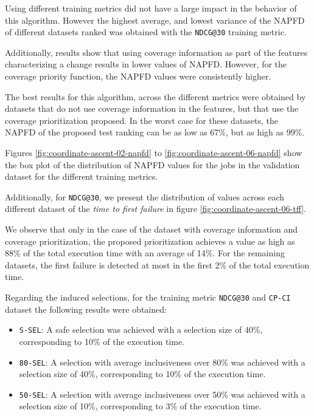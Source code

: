 Using different training metrics did not have a large impact in the behavior of this algorithm. 
However the highest average, and lowest variance of the NAPFD of different datasets ranked was obtained with the 
\texttt{NDCG@30} training metric.

Additionally, results show that using coverage information as part of the features characterizing a change
results in lower values of NAPFD. However, for the coverage priority function, the NAPFD values were 
consistently higher.

The best results for this algorithm, across the different metrics were obtained by datasets that do not
use coverage information in the features, but that use the coverage prioritization proposed. In the worst case
for these datasets, the NAPFD of the proposed test ranking can be as low as 67\%, but as high as 99\%.

Figures \ref{fig:coordinate-ascent-02-napfd} to \ref{fig:coordinate-ascent-06-napfd} show the box plot of the distribution
of NAPFD values for the jobs in the validation dataset for the different training metrics. 

Additionally, for \texttt{NDCG@30}, we present the distribution of values 
across each different dataset of the \emph{time to first failure} in figure \ref{fig:coordinate-ascent-06-tff}. 

We observe that only in the case of the dataset with coverage information and coverage prioritization, the proposed prioritization
achieves a value as high as 88\% of the total execution time with an average of 14\%. For the remaining datasets, the first failure is detected
at most in the first 2\% of the total execution time.

Regarding the induced selections, for the training metric \texttt{NDCG@30} and \texttt{CP-CI} dataset the following results were obtained:
\begin{itemize}
    \item \texttt{S-SEL}: A safe selection was achieved with a selection size of 40\%, corresponding to 10\% of the execution time.
    \item \texttt{80-SEL}: A selection with average inclusiveness over 80\% was achieved with a selection size of 40\%, corresponding to 10\% of the execution time.
    \item \texttt{50-SEL}: A selection with average inclusiveness over 50\% was achieved with a selection size of 10\%, corresponding to 3\% of the execution time.
\end{itemize}

